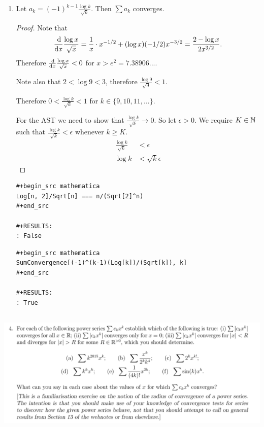 \documentclass[12pt]{article}
\begin{document}
\begin{enumerate}[label=(\alph*)]
\newpage
\item
  \begin{claim*}
    Let $a_k = (-1)^{k-1}\frac{\log k}{\sqrt k}$. Then $\sum a_k$ converges.
  \end{claim*}

  \begin{proof}
    Note that
    \begin{align*}
      \ddx \frac{\log x}{\sqrt{x}}
      = \frac{1}{x}\cdot x^{-1/2} + (\log x)(-1/2)x^{-3/2}
      = \frac{2 - \log x}{2x^{3/2}}.
    \end{align*}
    Therefore $\ddx \frac{\log x}{\sqrt{x}} < 0$ for $x > e^2 = 7.38906...$.

    Note also that $2 < \log 9 < 3$, therefore $\frac{\log 9}{\sqrt{9}} < 1$.

    Therefore $0 < \frac{\log k}{\sqrt{k}} < 1$ for $k \in \{9, 10, 11, \ldots\}$.

    For the AST we need to show that $\frac{\log k}{\sqrt{k}} \to 0$. So let $\epsilon > 0$. We
    require $K \in \mathbb{N}$ such that $\frac{\log k}{\sqrt{k}} < \epsilon$ whenever $k \geq K$.
    \begin{align*}
      \frac{\log k}{\sqrt{k}} &< \epsilon \\
      \log k &< \sqrt{k}\epsilon
    \end{align*}


  \end{proof}

\begin{verbatim}
#+begin_src mathematica
Log[n, 2]/Sqrt[n] === n/(Sqrt[2]^n)
#+end_src

#+RESULTS:
: False

\end{verbatim}


\begin{verbatim}
#+begin_src mathematica
SumConvergence[(-1)^(k-1)(Log[k])/(Sqrt[k]), k]
#+end_src

#+RESULTS:
: True

\end{verbatim}

\end{enumerate}

\newpage
\subsection{}
\begin{mdframed}
\includegraphics[width=400pt]{img/analysis--oxford-M2-I-6-4.png}
\end{mdframed}
\end{document}
